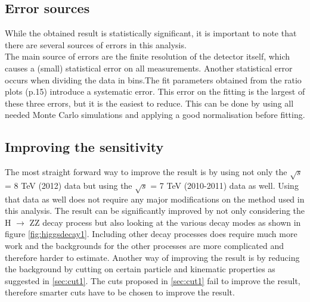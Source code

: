 \documentclass[a4paper,12pt]{article}
\begin{document}
\subsection{Error sources}
While the obtained result is statistically significant, it is important to note that there are several sources of errors in this analysis.\\
The main source of errors are the finite resolution of the detector itself, which causes a (small) statistical error on all measurements. Another statistical error occurs when dividing the data in bins.The fit parameters obtained from the ratio plots (p.15) introduce a systematic error. This error on the fitting is the largest of these three errors, but it is the easiest to reduce. This can be done by using all needed Monte Carlo simulations and applying a good normalisation before fitting. 




\subsection{Improving the sensitivity}
The most straight forward way to improve the result is by using not only the $\sqrt s$ = 8 TeV (2012) data but using the $\sqrt s$ = 7 TeV (2010-2011) data as well. Using that data as well does not require any major modifications on the method used in this analysis.
\newline
\newline
The result can be significantly improved by not only considering the H $\rightarrow$ ZZ decay process but also looking at the various decay modes as shown in figure \ref{fig:higgsdecay1}. Including other decay processes does require much more work and the backgrounds for the other processes are more complicated and therefore harder to estimate.
\newline
\newline
Another way of improving the result is by reducing the background by cutting on certain particle and kinematic properties as suggested in \ref{sec:cut1}. The cuts proposed in \ref{sec:cut1} fail to improve the result, therefore smarter cuts have to be chosen to improve the result.
\newpage




\end{document}
